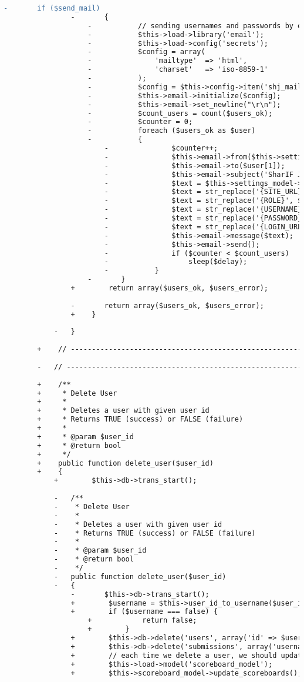 \begin{lstlisting}[language=diff, caption=Perubahan pada kode User\_model.php]
				-		if ($send_mail)
				-		{
					-			// sending usernames and passwords by email
					-			$this->load->library('email');
					-			$this->load->config('secrets');
					-			$config = array(
					-				'mailtype'  => 'html',
					-				'charset'   => 'iso-8859-1'
					-			);
					-			$config = $this->config->item('shj_mail');
					-			$this->email->initialize($config);
					-			$this->email->set_newline("\r\n");
					-			$count_users = count($users_ok);
					-			$counter = 0;
					-			foreach ($users_ok as $user)
					-			{
						-				$counter++;
						-				$this->email->from($this->settings_model->get_setting('mail_from'), $this->settings_model->get_setting('mail_from_name'));
						-				$this->email->to($user[1]);
						-				$this->email->subject('SharIF Judge Username and Password');
						-				$text = $this->settings_model->get_setting('add_user_mail');
						-				$text = str_replace('{SITE_URL}', base_url(), $text);
						-				$text = str_replace('{ROLE}', $user[4], $text);
						-				$text = str_replace('{USERNAME}', $user[0], $text);
						-				$text = str_replace('{PASSWORD}', htmlspecialchars($user[3]), $text);
						-				$text = str_replace('{LOGIN_URL}', base_url(), $text);
						-				$this->email->message($text);
						-				$this->email->send();
						-				if ($counter < $count_users)
						-					sleep($delay);
						-			}
					-		}
				+        return array($users_ok, $users_error);
				
				-		return array($users_ok, $users_error);
				+    }
			
			-	}
		
		+    // ------------------------------------------------------------------------
		
		-	// ------------------------------------------------------------------------
		
		+    /**
		+     * Delete User
		+     *
		+     * Deletes a user with given user id
		+     * Returns TRUE (success) or FALSE (failure)
		+     *
		+     * @param $user_id
		+     * @return bool
		+     */
		+    public function delete_user($user_id)
		+    {
			+        $this->db->trans_start();
			
			-	/**
			-	 * Delete User
			-	 *
			-	 * Deletes a user with given user id
			-	 * Returns TRUE (success) or FALSE (failure)
			-	 *
			-	 * @param $user_id
			-	 * @return bool
			-	 */
			-	public function delete_user($user_id)
			-	{
				-		$this->db->trans_start();
				+        $username = $this->user_id_to_username($user_id);
				+        if ($username === false) {
					+            return false;
					+        }
				+        $this->db->delete('users', array('id' => $user_id));
				+        $this->db->delete('submissions', array('username' => $username));
				+        // each time we delete a user, we should update all scoreboards
				+        $this->load->model('scoreboard_model');
				+        $this->scoreboard_model->update_scoreboards();
				

\end{lstlisting}
